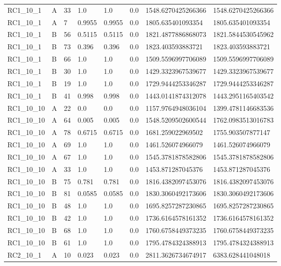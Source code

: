 \begin{tabular}{llllllll}
 RC1\_10\_1 & A & 33 & 1.0 & 1.0 & 0.0 & 1548.6270425266366 & 1548.6270425266366 \\
 RC1\_10\_1 & A & 7 & 0.9955 & 0.9955 & 0.0 & 1805.635401093354 & 1805.635401093354 \\
 RC1\_10\_1 & B & 56 & 0.5115 & 0.5115 & 0.0 & 1821.4877886868073 & 1821.5844530545962 \\
 RC1\_10\_1 & B & 73 & 0.396 & 0.396 & 0.0 & 1823.403593883721 & 1823.403593883721 \\
 RC1\_10\_1 & B & 66 & 1.0 & 1.0 & 0.0 & 1509.5596997706089 & 1509.5596997706089 \\
 RC1\_10\_1 & B & 30 & 1.0 & 1.0 & 0.0 & 1429.3323967539677 & 1429.3323967539677 \\
 RC1\_10\_1 & B & 19 & 1.0 & 1.0 & 0.0 & 1729.9444253346287 & 1729.9444253346287 \\
 RC1\_10\_1 & B & 41 & 0.998 & 0.998 & 0.0 & 1443.0141874312078 & 1443.2951165403542 \\
 RC1\_10\_10 & A & 22 & 0.0 & 0.0 & 0.0 & 1157.9764948036104 & 1399.4781146683536 \\
 RC1\_10\_10 & A & 64 & 0.005 & 0.005 & 0.0 & 1548.5209502600544 & 1762.0983513016783 \\
 RC1\_10\_10 & A & 78 & 0.6715 & 0.6715 & 0.0 & 1681.259022969502 & 1755.903507877147 \\
 RC1\_10\_10 & A & 69 & 1.0 & 1.0 & 0.0 & 1461.526074966079 & 1461.526074966079 \\
 RC1\_10\_10 & A & 67 & 1.0 & 1.0 & 0.0 & 1545.3781878582806 & 1545.3781878582806 \\
 RC1\_10\_10 & A & 33 & 1.0 & 1.0 & 0.0 & 1453.871287045376 & 1453.871287045376 \\
 RC1\_10\_10 & B & 75 & 0.781 & 0.781 & 0.0 & 1816.4382097453076 & 1816.4382097453076 \\
 RC1\_10\_10 & B & 81 & 0.0585 & 0.0585 & 0.0 & 1830.3060492173606 & 1830.3060492173606 \\
 RC1\_10\_10 & B & 48 & 1.0 & 1.0 & 0.0 & 1695.8257287230865 & 1695.8257287230865 \\
 RC1\_10\_10 & B & 42 & 1.0 & 1.0 & 0.0 & 1736.6164578161352 & 1736.6164578161352 \\
 RC1\_10\_10 & B & 68 & 1.0 & 1.0 & 0.0 & 1760.6758449373235 & 1760.6758449373235 \\
 RC1\_10\_10 & B & 61 & 1.0 & 1.0 & 0.0 & 1795.4784324388913 & 1795.4784324388913 \\
 RC2\_10\_1 & A & 10 & 0.023 & 0.023 & 0.0 & 2811.3626734674917 & 6383.628441048018 \\

\end{tabular}
